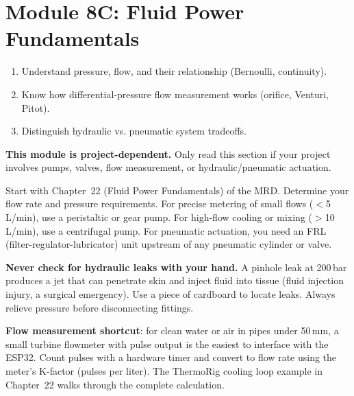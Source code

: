 \documentclass[11pt,letterpaper]{article}
\begin{document}
\section{Module 8C: Fluid Power Fundamentals}

\begin{priorities}
\begin{enumerate}[leftmargin=*, itemsep=1pt, topsep=0pt]
    \item Understand pressure, flow, and their relationship (Bernoulli, continuity).
    \item Know how differential-pressure flow measurement works (orifice, Venturi, Pitot).
    \item Distinguish hydraulic vs. pneumatic system tradeoffs.
\end{enumerate}
\end{priorities}

\begin{warnbox}
\textbf{This module is project-dependent.} Only read this section if your project involves pumps, valves, flow measurement, or hydraulic/pneumatic actuation.
\end{warnbox}

\begin{faqbox}
Start with Chapter~22 (Fluid Power Fundamentals) of the MRD. Determine your flow rate and pressure requirements. For precise metering of small flows ($<$5\,L/min), use a peristaltic or gear pump. For high-flow cooling or mixing ($>$10\,L/min), use a centrifugal pump. For pneumatic actuation, you need an FRL (filter-regulator-lubricator) unit upstream of any pneumatic cylinder or valve.
\end{faqbox}

\begin{warnbox}
\textbf{Never check for hydraulic leaks with your hand.} A pinhole leak at 200\,bar produces a jet that can penetrate skin and inject fluid into tissue (fluid injection injury, a surgical emergency). Use a piece of cardboard to locate leaks. Always relieve pressure before disconnecting fittings.
\end{warnbox}

\begin{tipbox}
\textbf{Flow measurement shortcut}: for clean water or air in pipes under 50\,mm, a small turbine flowmeter with pulse output is the easiest to interface with the ESP32. Count pulses with a hardware timer and convert to flow rate using the meter's K-factor (pulses per liter). The ThermoRig cooling loop example in Chapter~22 walks through the complete calculation.
\end{tipbox}
\end{document}
